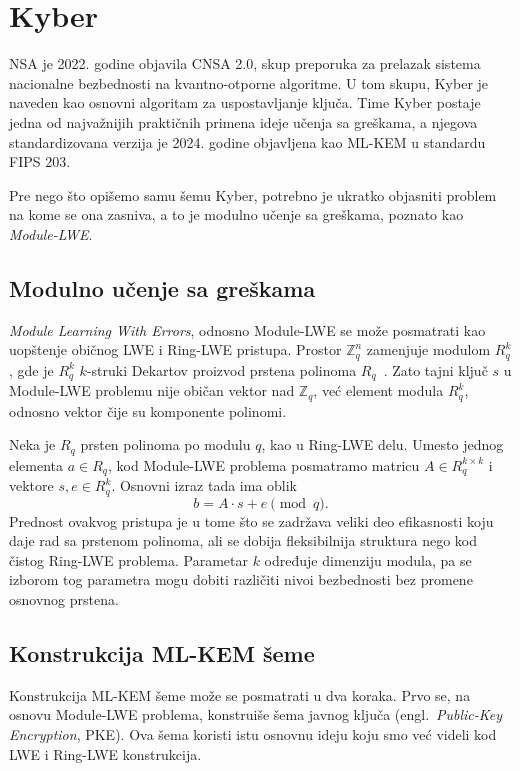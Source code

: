 \section{Kyber}

NSA je 2022. godine objavila CNSA 2.0, skup preporuka za prelazak sistema
nacionalne bezbednosti na kvantno-otporne algoritme. 
U tom skupu, Kyber je naveden kao osnovni algoritam za uspostavljanje ključa. 
Time Kyber postaje jedna od najvažnijih praktičnih primena ideje učenja sa greškama, 
a njegova standardizovana verzija je 2024. godine objavljena kao ML-KEM u standardu
FIPS 203.

Pre nego što opišemo samu šemu Kyber,
potrebno je ukratko objasniti problem na kome se ona zasniva, 
a to je modulno učenje sa greškama, 
poznato kao \emph{Module-LWE}.

\subsection{Modulno učenje sa greškama}

\emph{Module Learning With Errors}, odnosno Module-LWE se može posmatrati 
kao uopštenje običnog LWE i Ring-LWE pristupa. 
Prostor $\mathbb{Z}_q^n$ zamenjuje modulom $R_q^k$, 
gde je $R_q^k$ $k$-struki Dekartov proizvod prstena polinoma $R_q$~\cite{nistFips203}. 
Zato tajni ključ $s$ u Module-LWE problemu nije običan vektor nad $\mathbb{Z}_q$, 
već element modula $R_q^k$, odnosno vektor čije su komponente polinomi.

Neka je $R_q$ prsten polinoma po modulu $q$, kao u Ring-LWE delu. 
Umesto jednog elementa $a \in R_q$, kod Module-LWE problema posmatramo matricu
$ A \in R_q^{k \times k} $ i vektore $s,e \in R_q^k$.
Osnovni izraz tada ima oblik
\[
    b = A \cdot s + e \pmod q.
\]
Prednost ovakvog pristupa je u tome što se zadržava veliki deo efikasnosti koju
daje rad sa prstenom polinoma, 
ali se dobija fleksibilnija struktura nego kod čistog Ring-LWE problema. 
Parametar $k$ određuje dimenziju modula, 
pa se izborom tog parametra mogu dobiti različiti nivoi bezbednosti 
bez promene osnovnog prstena. 

\subsection{Konstrukcija ML-KEM šeme}

Konstrukcija ML-KEM šeme može se posmatrati u dva koraka.
Prvo se, na osnovu Module-LWE problema, 
konstruiše šema javnog ključa (engl.\ \emph{Public-Key Encryption}, PKE). 
Ova šema koristi istu osnovnu ideju koju smo već videli kod LWE i Ring-LWE konstrukcija.

